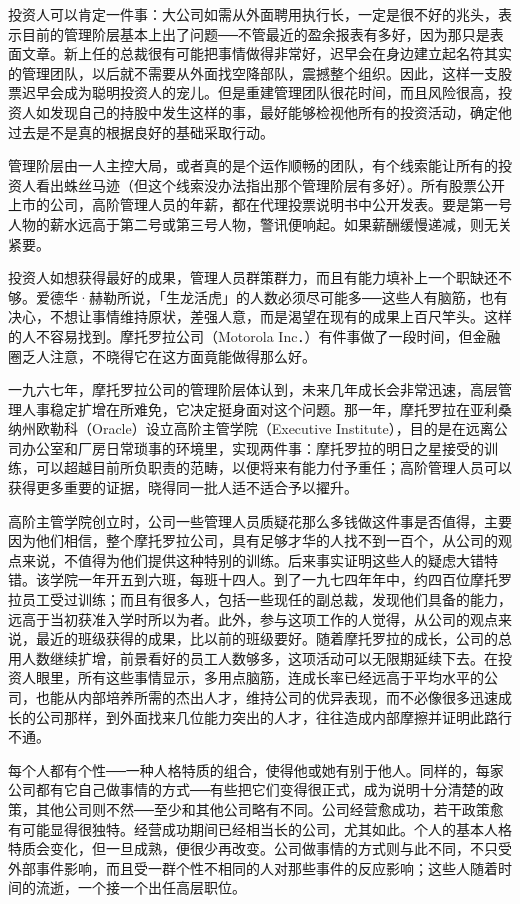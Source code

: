 \documentclass[UTF8,a4paper,zihao=-4,fontset = windows]{ctexart} %
\begin{document}
投资人可以肯定一件事：大公司如需从外面聘用执行长，一定是很不好的兆头，表示目前的管理阶层基本上出了问题──不管最近的盈余报表有多好，因为那只是表面文章。新上任的总裁很有可能把事情做得非常好，迟早会在身边建立起名符其实的管理团队，以后就不需要从外面找空降部队，震撼整个组织。因此，这样一支股票迟早会成为聪明投资人的宠儿。但是重建管理团队很花时间，而且风险很高，投资人如发现自己的持股中发生这样的事，最好能够检视他所有的投资活动，确定他过去是不是真的根据良好的基础采取行动。

管理阶层由一人主控大局，或者真的是个运作顺畅的团队，有个线索能让所有的投资人看出蛛丝马迹（但这个线索没办法指出那个管理阶层有多好）。所有股票公开上市的公司，高阶管理人员的年薪，都在代理投票说明书中公开发表。要是第一号人物的薪水远高于第二号或第三号人物，警讯便响起。如果薪酬缓慢递减，则无关紧要。

投资人如想获得最好的成果，管理人员群策群力，而且有能力填补上一个职缺还不够。爱德华·赫勒所说，「生龙活虎」的人数必须尽可能多──这些人有脑筋，也有决心，不想让事情维持原状，差强人意，而是渴望在现有的成果上百尺竿头。这样的人不容易找到。摩托罗拉公司（Motorola Inc．）有件事做了一段时间，但金融圈乏人注意，不晓得它在这方面竟能做得那么好。

一九六七年，摩托罗拉公司的管理阶层体认到，未来几年成长会非常迅速，高层管理人事稳定扩增在所难免，它决定挺身面对这个问题。那一年，摩托罗拉在亚利桑纳州欧勒科（Oracle）设立高阶主管学院（Executive Institute），目的是在远离公司办公室和厂房日常琐事的环境里，实现两件事：摩托罗拉的明日之星接受的训练，可以超越目前所负职责的范畴，以便将来有能力付予重任；高阶管理人员可以获得更多重要的证据，晓得同一批人适不适合予以擢升。

高阶主管学院创立时，公司一些管理人员质疑花那么多钱做这件事是否值得，主要因为他们相信，整个摩托罗拉公司，具有足够才华的人找不到一百个，从公司的观点来说，不值得为他们提供这种特别的训练。后来事实证明这些人的疑虑大错特错。该学院一年开五到六班，每班十四人。到了一九七四年年中，约四百位摩托罗拉员工受过训练；而且有很多人，包括一些现任的副总裁，发现他们具备的能力，远高于当初获准入学时所以为者。此外，参与这项工作的人觉得，从公司的观点来说，最近的班级获得的成果，比以前的班级要好。随着摩托罗拉的成长，公司的总用人数继续扩增，前景看好的员工人数够多，这项活动可以无限期延续下去。在投资人眼里，所有这些事情显示，多用点脑筋，连成长率已经远高于平均水平的公司，也能从内部培养所需的杰出人才，维持公司的优异表现，而不必像很多迅速成长的公司那样，到外面找来几位能力突出的人才，往往造成内部摩擦并证明此路行不通。

每个人都有个性──一种人格特质的组合，使得他或她有别于他人。同样的，每家公司都有它自己做事情的方式──有些把它们变得很正式，成为说明十分清楚的政策，其他公司则不然──至少和其他公司略有不同。公司经营愈成功，若干政策愈有可能显得很独特。经营成功期间已经相当长的公司，尤其如此。个人的基本人格特质会变化，但一旦成熟，便很少再改变。公司做事情的方式则与此不同，不只受外部事件影响，而且受一群个性不相同的人对那些事件的反应影响；这些人随着时间的流逝，一个接一个出任高层职位。
\end{document}
